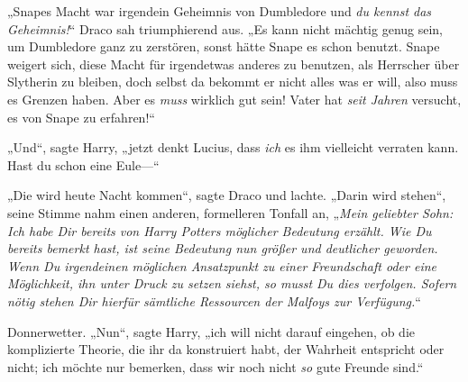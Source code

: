 „Snapes Macht war irgendein Geheimnis von Dumbledore und \emph{du kennst das Geheimnis!}“ Draco sah triumphierend aus. „Es kann nicht mächtig genug sein, um Dumbledore ganz zu zerstören, sonst hätte Snape es schon benutzt. Snape weigert sich, diese Macht für irgendetwas anderes zu benutzen, als Herrscher über Slytherin zu bleiben, doch selbst da bekommt er nicht alles was er will, also muss es Grenzen haben. Aber es \emph{muss} wirklich gut sein! Vater hat \emph{seit Jahren} versucht, es von Snape zu erfahren!“

„Und“, sagte Harry, „jetzt denkt Lucius, dass \emph{ich} es ihm vielleicht verraten kann. Hast du schon eine Eule—“

„Die wird heute Nacht kommen“, sagte Draco und lachte. „Darin wird stehen“, seine Stimme nahm einen anderen, formelleren Tonfall an, „\emph{Mein geliebter Sohn: Ich habe Dir bereits von Harry Potters möglicher Bedeutung erzählt. Wie Du bereits bemerkt hast, ist seine Bedeutung nun größer und deutlicher geworden. Wenn Du irgendeinen möglichen Ansatzpunkt zu einer Freundschaft oder eine Möglichkeit, ihn unter Druck zu setzen siehst, so musst Du dies verfolgen. Sofern nötig stehen Dir hierfür sämtliche Ressourcen der Malfoys zur Verfügung.}“

Donnerwetter. „Nun“, sagte Harry, „ich will nicht darauf eingehen, ob die komplizierte Theorie, die ihr da konstruiert habt, der Wahrheit entspricht oder nicht; ich möchte nur bemerken, dass wir noch nicht \emph{so} gute Freunde sind.“

